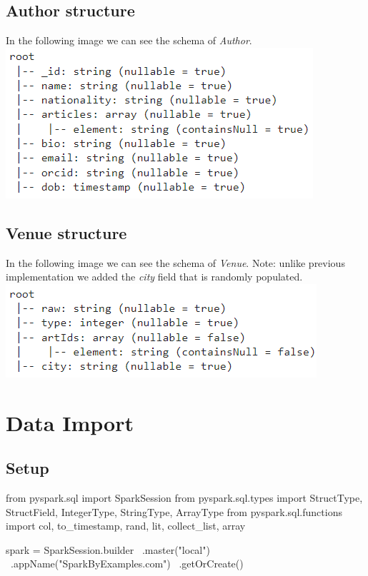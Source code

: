 \documentclass{Configuration_Files/PoliMi3i_thesis}
\begin{document}
\section{Author structure}
In the following image we can see the schema of \emph{Author}.\newline
\includegraphics{author_schema}

\section{Venue structure}
In the following image we can see the schema of \emph{Venue}.\newline
Note: unlike previous implementation we added the \emph{city} field that is randomly populated.
\includegraphics{venue_schema}

\chapter{Data Import}
\label{ch:data_import}
\section{Setup}
\begin{python}
from pyspark.sql import SparkSession
from pyspark.sql.types import StructType, StructField, IntegerType, StringType, ArrayType
from pyspark.sql.functions import col, to_timestamp, rand, lit, collect_list, array

spark = SparkSession.builder \
    .master("local") \
    .appName("SparkByExamples.com") \
    .getOrCreate()
\end{python}
\end{document}
